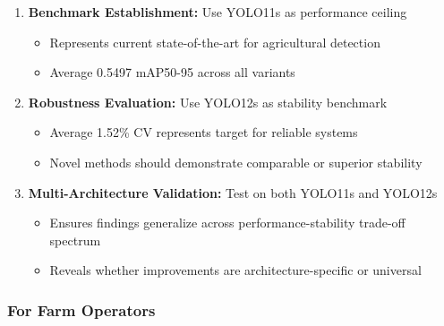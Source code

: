 \begin{enumerate}
    \item \textbf{Benchmark Establishment:} Use YOLO11s as performance ceiling
    \begin{itemize}
        \item Represents current state-of-the-art for agricultural detection
        \item Average 0.5497 mAP50-95 across all variants
    \end{itemize}
    
    \item \textbf{Robustness Evaluation:} Use YOLO12s as stability benchmark
    \begin{itemize}
        \item Average 1.52\% CV represents target for reliable systems
        \item Novel methods should demonstrate comparable or superior stability
    \end{itemize}
    
    \item \textbf{Multi-Architecture Validation:} Test on both YOLO11s and YOLO12s
    \begin{itemize}
        \item Ensures findings generalize across performance-stability trade-off spectrum
        \item Reveals whether improvements are architecture-specific or universal
    \end{itemize}
\end{enumerate}

\subsubsection{For Farm Operators}

